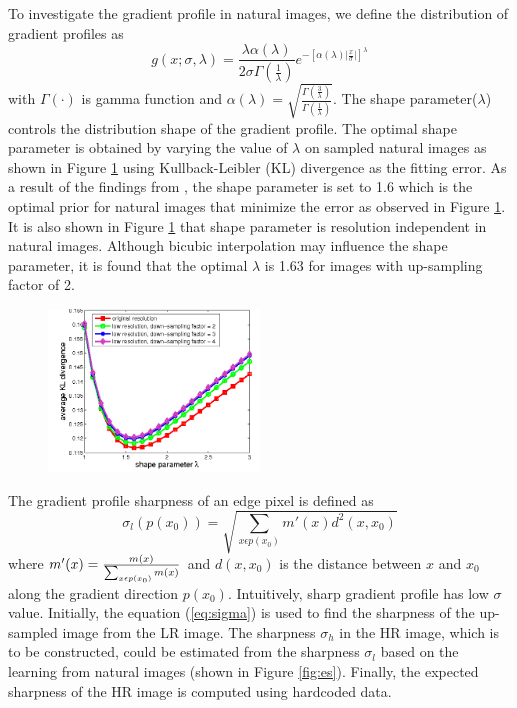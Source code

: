 \documentclass[a4paper,11pt]{article}
\begin{document}
To investigate the gradient profile in natural images, we define the distribution of gradient profiles as
\begin{equation}
	g(x; \sigma, \lambda) = \frac{\lambda \alpha (\lambda)}{2 \sigma \Gamma(\frac{1}{\lambda})} e^{-[\alpha (\lambda)\lvert \frac{x}{\sigma} \rvert]^\lambda}
\end{equation}
with $\Gamma(\cdot)$ is gamma function and $\alpha (\lambda) = \sqrt{\frac{\Gamma(\frac{3}{\lambda})}{\Gamma(\frac{1}{\lambda})}}$. The shape parameter($\lambda$) controls the distribution shape of the gradient profile. The optimal shape parameter is obtained by varying the value of $\lambda$ on sampled natural images as shown in Figure \ref{fig:shapep} using Kullback-Leibler (KL) divergence as the fitting error. As a result of the findings from \cite{sr11}, the shape parameter is set to 1.6 which is the optimal prior for natural images that minimize the error as observed in Figure \ref{fig:shapep}. It is also shown in Figure \ref{fig:shapep} that shape parameter is resolution independent in natural images. Although bicubic interpolation may influence the shape parameter, it is found that the optimal $\lambda$ is 1.63 for images with up-sampling factor of 2. 

\begin{figure}[H]
	\centering
	\includegraphics[width=0.5\textwidth]{3-Figure2-1.png}
	\caption{}
	\label{fig:shapep}
\end{figure}

The gradient profile sharpness of an edge pixel is defined as
\begin{equation}
	\label{eq:sigma}
	\sigma_l(p(x_0)) = \sqrt{\sum_{x \epsilon p(x_0)} m'(x) d^2(x, x_0)}
\end{equation}
where $m'(x) = {m(x) \over \sum_{x \epsilon p(x_0)} m(x)}$ and $d(x,x_0)$ is the distance between $x$ and $x_0$ along the gradient direction $p(x_0)$. Intuitively, sharp gradient profile has low $\sigma$ value. Initially, the equation (\ref{eq:sigma}) is used to find the sharpness of the up-sampled image from the LR image. The sharpness $\sigma_h$ in the HR image, which is to be constructed, could be estimated from the sharpness $\sigma_l$ based on the learning from natural images (shown in Figure \ref{fig:es}). Finally, the expected sharpness of the HR image is computed using hardcoded data.
\end{document}
